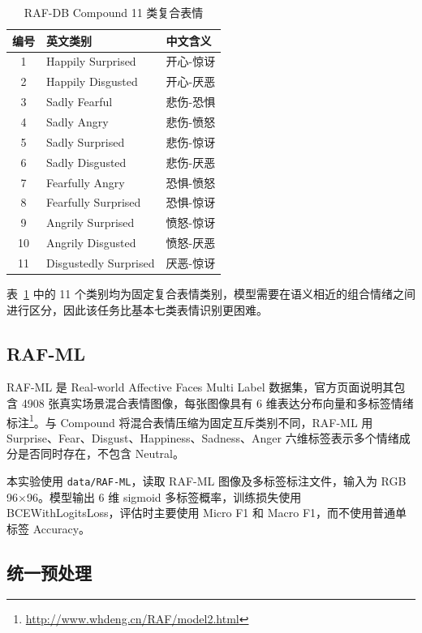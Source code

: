 \documentclass[UTF8,a4paper,12pt]{ctexart}
\newcommand{\code}[1]{\texttt{#1}}
\newcommand{\sourceurl}[1]{\footnote{\url{#1}}}
\begin{document}
\begin{table}[H]
  \centering
  \caption{RAF-DB Compound 11 类复合表情}
  \label{tab:compound_classes}
  \small
  \begin{tabular}{cll}
    \toprule
    编号 & 英文类别 & 中文含义 \\
    \midrule
    1 & Happily Surprised & 开心-惊讶 \\
    2 & Happily Disgusted & 开心-厌恶 \\
    3 & Sadly Fearful & 悲伤-恐惧 \\
    4 & Sadly Angry & 悲伤-愤怒 \\
    5 & Sadly Surprised & 悲伤-惊讶 \\
    6 & Sadly Disgusted & 悲伤-厌恶 \\
    7 & Fearfully Angry & 恐惧-愤怒 \\
    8 & Fearfully Surprised & 恐惧-惊讶 \\
    9 & Angrily Surprised & 愤怒-惊讶 \\
    10 & Angrily Disgusted & 愤怒-厌恶 \\
    11 & Disgustedly Surprised & 厌恶-惊讶 \\
    \bottomrule
  \end{tabular}
\end{table}

表~\ref{tab:compound_classes} 中的 11 个类别均为固定复合表情类别，模型需要在语义相近的组合情绪之间进行区分，因此该任务比基本七类表情识别更困难。

\subsection{RAF-ML}

RAF-ML 是 Real-world Affective Faces Multi Label 数据集，官方页面说明其包含 4908 张真实场景混合表情图像，每张图像具有 6 维表达分布向量和多标签情绪标注\sourceurl{http://www.whdeng.cn/RAF/model2.html}。与 Compound 将混合表情压缩为固定互斥类别不同，RAF-ML 用 Surprise、Fear、Disgust、Happiness、Sadness、Anger 六维标签表示多个情绪成分是否同时存在，不包含 Neutral。

本实验使用 \code{data/RAF-ML}，读取 RAF-ML 图像及多标签标注文件，输入为 RGB 96$\times$96。模型输出 6 维 sigmoid 多标签概率，训练损失使用 BCEWithLogitsLoss，评估时主要使用 Micro F1 和 Macro F1，而不使用普通单标签 Accuracy。

\subsection{统一预处理}
\end{document}

